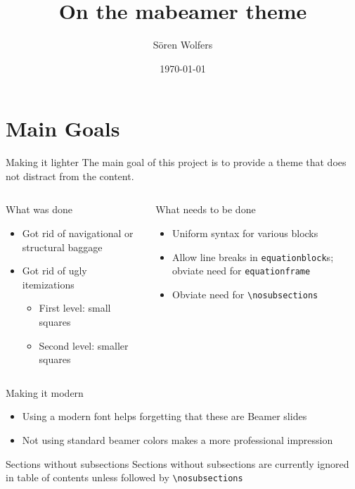 \documentclass{beamer}
\title{On the mabeamer theme}
\date{\today}
\author{Sören Wolfers}
\begin{document}
\matitle

\section{Main Goals}
\nosubsections

\begin{frame}{Making it lighter}
The main goal of this project is to provide a theme that does not distract from the content.
\begin{columns}
	\begin{column}{0.5\textwidth}	
		\begin{block}{What  was done}
		\begin{itemize}
		\item Got rid of navigational or structural baggage
		\item Got rid of ugly itemizations%
		\begin{itemize}
		\item First level: small squares
		\item Second level: smaller squares
		\end{itemize}
		\end{itemize}
		\end{block}
	\end{column}
	\begin{column}{0.5\textwidth}
		\begin{block}{What  needs to be done}
		\begin{itemize}
			\item Uniform syntax for various blocks
			\item Allow line breaks in \texttt{equationblock}s; obviate need for \texttt{equationframe}
			\item Obviate need for \texttt{\textbackslash nosubsections}  
		\end{itemize}
		\end{block}
	\end{column}
\end{columns}
\end{frame}

\begin{frame}{Making it modern}
\begin{itemize}
	\item Using a modern font helps forgetting that these are Beamer slides

	\item Not using {\color{yellow}standard} {\color{blue}beamer} {\color{red}colors} makes a more professional impression
\end{itemize}
\begin{block}{Sections without subsections}
	Sections without subsections are currently ignored in table of contents unless followed by \texttt{\textbackslash nosubsections}
\end{block}
\end{frame}
\end{document}
